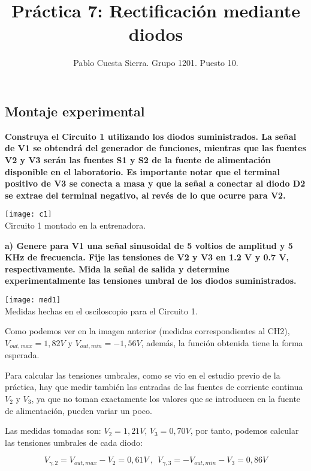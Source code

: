 \documentclass{article}
\title{Práctica 7: Rectificación mediante diodos}
\date{}
\author{Pablo Cuesta Sierra. Grupo 1201. Puesto 10.}
\begin{document}
\maketitle

\begin{center}
\section*{Montaje experimental}
\end{center}

\textbf{Construya el Circuito 1 utilizando los diodos suministrados. La señal de V1 se obtendrá
del generador de funciones, mientras que las fuentes V2 y V3 serán las fuentes S1 y S2 de la
fuente de alimentación disponible en el laboratorio. Es importante notar que el terminal positivo
de V3 se conecta a masa y que la señal a conectar al diodo D2 se extrae del terminal negativo,
al revés de lo que ocurre para V2.}

\bigskip
\begin{center}
\texttt{[image: c1]}\\
Circuito 1 montado en la entrenadora.
\end{center}


\textbf{a) Genere para V1 una señal sinusoidal de 5 voltios de amplitud y 5 KHz de frecuencia.
Fije las tensiones de V2 y V3 en 1.2 V y 0.7 V, respectivamente. Mida la señal de
salida y determine experimentalmente las tensiones umbral de los diodos
suministrados. }

\bigskip
\begin{center}
\texttt{[image: med1]}\\
Medidas hechas en el osciloscopio para el Circuito 1.
\end{center}

Como podemos ver en la imagen anterior (medidas correspondientes al CH2), $V_{out, max}=1,82V$ y $V_{out, min}=-1,56V$, además, la función obtenida tiene la forma esperada.

Para calcular las tensiones umbrales, como se vio en el estudio previo de la práctica, hay que medir también las entradas de las fuentes de corriente continua $V_2$ y $V_3$, ya que no toman exactamente los valores que se introducen en la fuente de alimentación, pueden variar un poco.

Las medidas tomadas son: $V_2=1,21V$, $V_3=0,70V$, por tanto, podemos calcular las tensiones umbrales de cada diodo:

$$V_{\gamma, 2}=V_{out, max}-V_2 = 0,61V\ ,\ \ V_{\gamma, 3}=-V_{out, min}-V_3 = 0,86V$$
\end{document}
